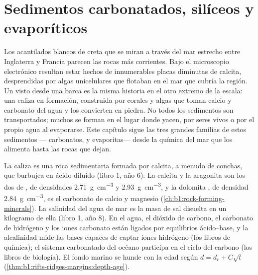 \chapter{Sedimentos carbonatados, silíceos y evaporíticos}\label{ch:b1:chemical-biogenic-sediments}

Los acantilados blancos de creta que se miran a través del mar estrecho entre Inglaterra y Francia parecen las rocas más corrientes. Bajo el microscopio electrónico resultan
estar hechos de innumerables placas diminutas de calcita, desprendidas por algas unicelulares que flotaban en el mar que cubría la región. Un  visto desde una barca es la misma
historia en el otro extremo de la escala: una caliza en formación, construida por corales y algas que toman calcio y carbonato del agua y los convierten en piedra. No todos los sedimentos
son transportados; muchos se forman en el lugar donde yacen, por seres vivos o por el propio agua al evaporarse. Este capítulo sigue las tres grandes familias de estos sedimentos ---
carbonatos,  y evaporitas--- desde la química del mar que los alimenta hasta las rocas que dejan.

\begin{recall}
La caliza es una roca sedimentaria formada por calcita, a menudo de conchas, que burbujea en ácido diluido (libro 1, año 6). La calcita y la aragonita son los dos 
de , de densidades \qty{2.71}{g.cm^{-3}} y \qty{2.93}{g.cm^{-3}}, y la dolomita , de densidad \qty{2.84}{g.cm^{-3}}, es el carbonato de calcio y
magnesio (\cref{ch:b1:rock-forming-minerals}). La salinidad del agua de mar es la masa de sal disuelta en un kilogramo de ella (libro 1, año 8). En el agua, el dióxido de carbono,
el carbonato de hidrógeno y los iones carbonato están ligados por equilibrios ácido--base, y la alcalinidad mide las bases capaces de captar iones hidrógeno (los libros de química);
el sistema carbonatado del océano participa en el ciclo del carbono (los libros de biología). El fondo marino se hunde con la edad según $d = d_r + C\sqrt t$
(\cref{thm:b1:rifts-ridges-margins:depth-age}).
\end{recall}


